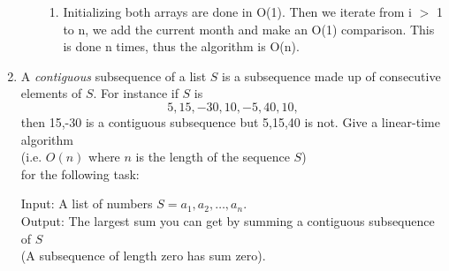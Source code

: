 \documentclass[11pt]{article}
\begin{document}
\begin{enumerate}
\begin{enumerate}
\begin{enumerate}
\item
Initializing both arrays are done in O(1). Then we iterate from i $>$ 1 to n, we add the current month and make an O(1) comparison. This is done n times, thus the algorithm is O(n).
\end{enumerate}
\end{enumerate}
\newpage
\item
A {\em contiguous} subsequence of a list $S$ is a
subsequence made up of consecutive elements of $S$. For
instance if $S$ is
$$ 5,15,-30,10,-5,40,10,$$
then 15,-30 is a contiguous subsequence but 5,15,40 is not.
Give a linear-time algorithm 
\\(i.e. $O(n)$ where $n$ is the
length of the sequence $S$) 
\\for the following task:

Input: A list of numbers $S=a_1,a_2,\ldots,a_n$.
\\
Output: The largest sum you can get by summing a contiguous
subsequence of $S$ 
\\(A subsequence of length zero has sum zero).



\end{enumerate}
\end{document}
